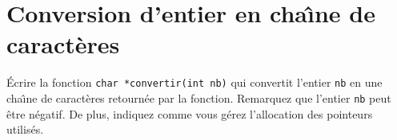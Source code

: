 \section{Conversion d'entier en cha\^\i{}ne de caract\`eres}
  \'Ecrire la  fonction \texttt{char *convertir(int nb)} qui convertit
  l'entier \texttt{nb} en une  cha\^\i{}ne de caract\`eres retourn\'ee
  par  la fonction.   Remarquez que  l'entier \texttt{nb} peut  \^etre
  n\'egatif. De plus,  indiquez comme  vous g\'erez l'allocation   des
  pointeurs utilis\'es.
